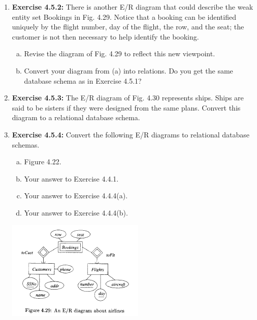 \documentclass[12pt]{article}
\begin{document}
\begin{enumerate}[1.]
    \item \textbf{Exercise 4.5.2:} There is another E/R diagram that could describe the weak
    entity set Bookings in Fig. 4.29. Notice that a booking can be identified uniquely
    by the flight number, day of the flight, the row, and the seat; the customer is
    not then necessary to help identify the booking.

    \begin{enumerate}[a)]
        \item Revise the diagram of Fig. 4.29 to reflect this new viewpoint.
        \item Convert your diagram from (a) into relations. Do you get the same database schema as in Exercise 4.5.1?
    \end{enumerate}

    \item \textbf{Exercise 4.5.3:} The E/R diagram of Fig. 4.30 represents ships. Ships are said
    to be sisters if they were designed from the same plans. Convert this diagram
    to a relational database schema.

    \item \textbf{Exercise 4.5.4:} Convert the following E/R diagrams to relational database
    schemas.

    \begin{enumerate}[a)]
        \item Figure 4.22.
        \item Your answer to Exercise 4.4.1.
        \item Your answer to Exercise 4.4.4(a).
        \item Your answer to Exercise 4.4.4(b).
    \end{enumerate}

    \begin{center}
    \includegraphics[width=0.7\linewidth]{images/worksheet_14_3.png}
    \end{center}


\end{enumerate}
\end{document}
